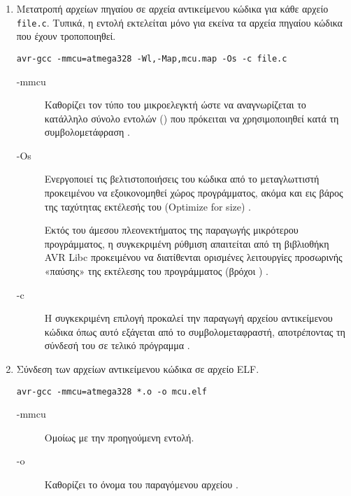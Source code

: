 \begin{enumerate}

    \item Μετατροπή αρχείων πηγαίου σε αρχεία αντικείμενου κώδικα για κάθε
    αρχείο \verb~file.c~. Τυπικά, η εντολή εκτελείται μόνο για εκείνα τα αρχεία
    πηγαίου κώδικα που έχουν τροποποιηθεί.

\begin{lstlisting}
avr-gcc -mmcu=atmega328 -Wl,-Map,mcu.map -Os -c file.c
\end{lstlisting}

    \begin{description}
        \item[-mmcu] Καθορίζει τον τύπο του μικροελεγκτή ώστε να αναγνωρίζεται
        το κατάλληλο σύνολο εντολών () που πρόκειται να
        χρησιμοποιηθεί κατά τη συμβολομετάφραση \parencite{gcc:options}.

        \item[-Os] Ενεργοποιεί τις βελτιστοποιήσεις του κώδικα από το
        μεταγλωττιστή προκειμένου να εξοικονομηθεί χώρος προγράμματος, ακόμα και
        εις βάρος της ταχύτητας εκτέλεσής του (Optimize for size)
        \parencites[338]{avrlibc}{gcc:options}.

        Εκτός του άμεσου πλεονεκτήματος της παραγωγής μικρότερου προγράμματος, η
        συγκεκριμένη ρύθμιση απαιτείται από τη βιβλιοθήκη AVR Libc προκειμένου
        να διατίθενται ορισμένες λειτουργίες προσωρινής «παύσης» της εκτέλεσης
        του προγράμματος (βρόχοι ) \parencite[328]{avrlibc}.

        \item[-c] Η συγκεκριμένη επιλογή προκαλεί την παραγωγή αρχείου
        αντικείμενου κώδικα όπως αυτό εξάγεται από το συμβολομεταφραστή,
        αποτρέποντας τη σύνδεσή του σε τελικό πρόγραμμα
        \parencites[338]{avrlibc}{gcc:options}.
    \end{description}


    \item Σύνδεση των αρχείων αντικείμενου κώδικα σε αρχείο ELF.
\begin{lstlisting}
avr-gcc -mmcu=atmega328 *.o -o mcu.elf
\end{lstlisting}

    \begin{description}
        \item[-mmcu] Ομοίως με την προηγούμενη εντολή.

        \item[-o] Καθορίζει το όνομα του παραγόμενου αρχείου
        \parencite{gcc:options}.
    \end{description}



\end{enumerate}
